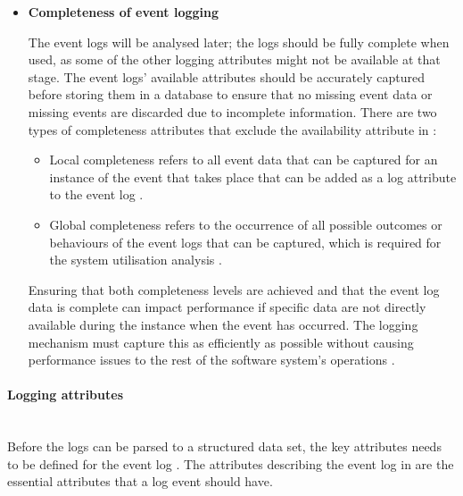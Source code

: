 \begin{itemize}
	\item \textbf{Completeness of event logging}\par The event logs will be analysed later; the logs should be fully complete when used, as some of the other logging attributes might not be available at that stage. The event logs' available attributes should be accurately captured before storing them in a database to ensure that no missing event data or missing events are discarded due to incomplete information. There are two types of completeness attributes that exclude the availability attribute in :

	\begin{itemize}
		\item Local completeness refers to all event data that can be captured for an instance of the event that takes place that can be added as a log attribute to the event log \cite{Kherbouche2017, VanDerAalst2004}.
		\item Global completeness refers to the occurrence of all possible outcomes or behaviours of the event logs that can be captured, which is required for the system utilisation analysis \cite{Kherbouche2017, VanDerAalst2004}.
	\end{itemize}

	Ensuring that both completeness levels are achieved and that the event log data is complete can impact performance if specific data are not directly available during the instance when the event has occurred. The logging mechanism must capture this as efficiently as possible without causing performance issues to the rest of the software system's operations \cite{Zhu2015, Zhu2019}. 
\end{itemize}

\paragraph{Logging attributes}\leavevmode\\
Before the logs can be parsed to a structured data set, the key attributes needs to be defined for the event log \cite{Bekeneva2020}. The attributes describing the event log in  are the essential attributes that a log event should have. 

